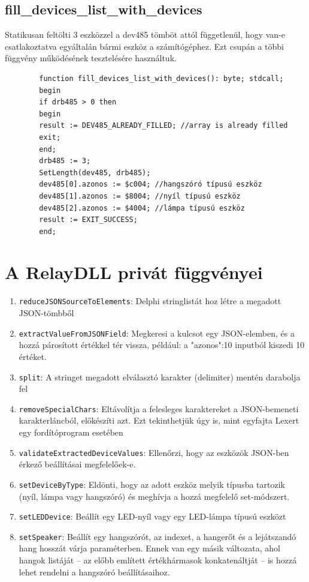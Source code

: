 \documentclass[tocnopagenum]{thesis-ekf}
\begin{document}
	\subsection{fill\_devices\_list\_with\_devices} Statikusan feltölti 3 eszközzel a dev485 tömböt attól függetlenül, hogy van-e csatlakoztatva egyáltalán bármi eszköz a számítógéphez. Ezt csupán a többi függvény működésének tesztelésére használtuk.
	
	\begin{verbatim}
		function fill_devices_list_with_devices(): byte; stdcall;
		begin
		if drb485 > 0 then
		begin
		result := DEV485_ALREADY_FILLED; //array is already filled
		exit;
		end;
		drb485 := 3;
		SetLength(dev485, drb485);
		dev485[0].azonos := $c004; //hangszóró típusú eszköz
		dev485[1].azonos := $8004; //nyíl típusú eszköz
		dev485[2].azonos := $4004; //lámpa típusú eszköz
		result := EXIT_SUCCESS;
		end;
	\end{verbatim}

	\section{A RelayDLL privát függvényei}
	\begin{enumerate}
  		\item \verb*|reduceJSONSourceToElements|: Delphi stringlistát hoz létre a megadott JSON-tömbből
		\item \verb*|extractValueFromJSONField|:  Megkeresi a kulcsot egy JSON-elemben, és a hozzá párosított értékkel tér vissza, például: a "azonos":10 inputból kiszedi 10 értéket.
		\item \verb*|split|: A stringet megadott elválasztó karakter (delimiter) mentén darabolja fel
		\item \verb*|removeSpecialChars|: Eltávolítja a felesleges karaktereket a JSON-bemeneti karakterláncból, előkészíti azt. Ezt tekinthetjük úgy is, mint egyfajta Lexert egy fordítóprogram esetében
		\item \verb*|validateExtractedDeviceValues|: Ellenőrzi, hogy az eszközök JSON-ben érkező beállításai megfelelőek-e.
		\item \verb*|setDeviceByType|: Eldönti, hogy az adott eszköz melyik típusba tartozik (nyíl, lámpa vagy hangszóró) és meghívja a hozzá megfelelő set-módszert.
		\item \verb*|setLEDDevice|: Beállít egy LED-nyíl vagy egy LED-lámpa típusú eszközt
		\item \verb*|setSpeaker|: Beállít egy hangszórót, az indexet, a hangerőt és a lejátszandó hang hosszát várja paraméterben. Ennek van egy másik változata, ahol hangok listáját -- az előbb említett értékhármasok konkatenáltját -- is hozzá lehet rendelni a hangszóró beállításaihoz.
	\end{enumerate}
\end{document}
